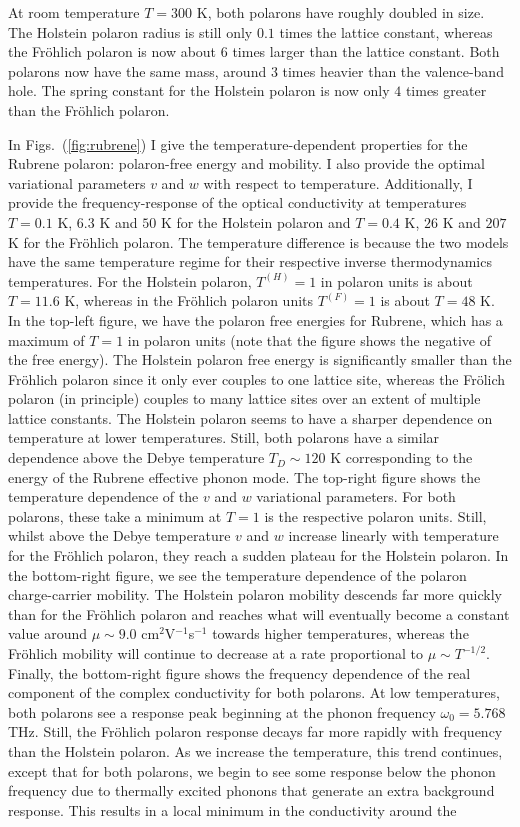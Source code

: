 At room temperature $T = 300$ K, both polarons have roughly doubled in size. The Holstein polaron radius is still only $0.1$ times the lattice constant, whereas the Fr\"ohlich polaron is now about $6$ times larger than the lattice constant. Both polarons now have the same mass, around $3$ times heavier than the valence-band hole. The spring constant for the Holstein polaron is now only $4$ times greater than the Fr\"ohlich polaron.

In Figs.~(\ref{fig:rubrene}) I give the temperature-dependent properties for the Rubrene polaron: polaron-free energy and mobility. I also provide the optimal variational parameters $v$ and $w$ with respect to temperature.  Additionally, I provide the frequency-response of the optical conductivity at temperatures $T = 0.1$ K, $6.3$ K and $50$ K for the Holstein polaron and $T = 0.4$ K, $26$ K and $207$ K for the Fr\"ohlich polaron. The temperature difference is because the two models have the same temperature regime for their respective inverse thermodynamics temperatures. For the Holstein polaron, $T^{(H)} = 1$ in polaron units is about $T = 11.6$ K, whereas in the Fr\"ohlich polaron units $T^{(F)} = 1$ is about $T = 48$ K. In the top-left figure, we have the polaron free energies for Rubrene, which has a maximum of $T = 1$ in polaron units (note that the figure shows the negative of the free energy). The Holstein polaron free energy is significantly smaller than the Fr\"ohlich polaron since it only ever couples to one lattice site, whereas the Fr\"olich polaron (in principle) couples to many lattice sites over an extent of multiple lattice constants. The Holstein polaron seems to have a sharper dependence on temperature at lower temperatures. Still, both polarons have a similar dependence above the Debye temperature $T_D \sim 120$ K corresponding to the energy of the Rubrene effective phonon mode. The top-right figure shows the temperature dependence of the $v$ and $w$ variational parameters. For both polarons, these take a minimum at $T=1$ is the respective polaron units. Still, whilst above the Debye temperature $v$ and $w$ increase linearly with temperature for the Fr\"ohlich polaron, they reach a sudden plateau for the Holstein polaron. In the bottom-right figure, we see the temperature dependence of the polaron charge-carrier mobility. The Holstein polaron mobility descends far more quickly than for the Fr\"ohlich polaron and reaches what will eventually become a constant value around $\mu \sim 9.0$ cm$^2$V$^{-1}$s$^{-1}$ towards higher temperatures, whereas the Fr\"ohlich mobility will continue to decrease at a rate proportional to $\mu \sim T^{-1/2}$. Finally, the bottom-right figure shows the frequency dependence of the real component of the complex conductivity for both polarons. At low temperatures, both polarons see a response peak beginning at the phonon frequency $\omega_0 = 5.768$ THz. Still, the Fr\"ohlich polaron response decays far more rapidly with frequency than the Holstein polaron. As we increase the temperature, this trend continues, except that for both polarons, we begin to see some response below the phonon frequency due to thermally excited phonons that generate an extra background response. This results in a local minimum in the conductivity around the 